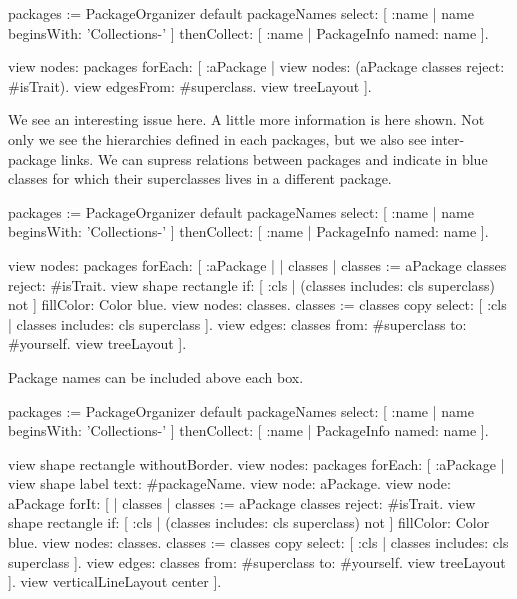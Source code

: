 \documentclass[a4paper,10pt,twoside]{book}
\begin{document}
\begin{code}{}
packages := PackageOrganizer default packageNames
        select: [ :name | name beginsWith: 'Collections-' ] 
        thenCollect:  [ :name | PackageInfo named: name ].
        
view nodes: packages forEach: [ :aPackage | 
  view nodes: (aPackage classes reject: #isTrait).
  view edgesFrom: #superclass.
  view treeLayout
].
\end{code}

We see an interesting issue here. A little more information is here shown. Not only we see the hierarchies defined in each packages, but we also see inter-package links. We can supress relations between packages and indicate in blue classes for which their superclasses lives in a different package.

\begin{code}{}
packages := PackageOrganizer default packageNames
        select: [ :name | name beginsWith: 'Collections-' ] 
        thenCollect:  [ :name | PackageInfo named: name ].
        
view nodes: packages forEach: [ :aPackage | 
  | classes |
  classes := aPackage classes reject: #isTrait.
  view shape rectangle 
    if: [ :cls | (classes includes: cls superclass) not ] fillColor: Color blue.
  view nodes: classes.
  classes := classes copy select: [ :cls | classes includes: cls superclass ].
  view edges: classes from: #superclass to: #yourself.
  view treeLayout
].
\end{code}

Package names can be included above each box.

\begin{code}{}
packages := PackageOrganizer default packageNames
        select: [ :name | name beginsWith: 'Collections-' ] 
        thenCollect:  [ :name | PackageInfo named: name ].

view shape rectangle withoutBorder.
view nodes: packages forEach: [ :aPackage | 
  view shape label text: #packageName.
  view node: aPackage.
  view node: aPackage forIt: [
    | classes |
    classes := aPackage classes reject: #isTrait.
    view shape rectangle 
      if: [ :cls | (classes includes: cls superclass) not ] fillColor: Color blue.
    view nodes: classes.
    classes := classes copy select: [ :cls | classes includes: cls superclass ].
    view edges: classes from: #superclass to: #yourself.
    view treeLayout
  ].
  view verticalLineLayout center
].
\end{code}
\end{document}

